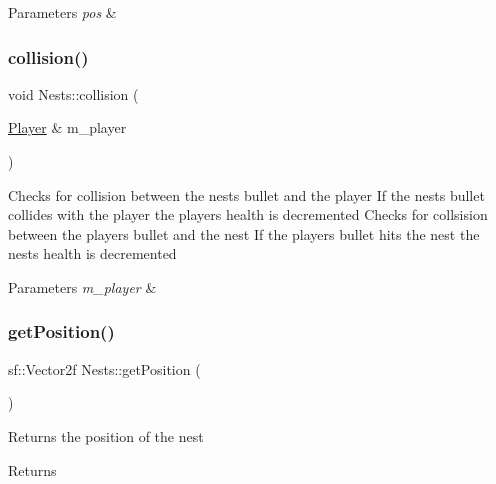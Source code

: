 \begin{DoxyParams}{Parameters}
{\em pos} & \\
\hline
\end{DoxyParams}
\mbox{\label{class_nests_a524f84ef21f6cf7943f2a82eecc1d18e}} 
\subsubsection{\texorpdfstring{collision()}{collision()}}
{\footnotesize\ttfamily void Nests\+::collision (\begin{DoxyParamCaption}\item[{\mbox{\hyperlink{class_player}{Player}} \&}]{m\+\_\+player }\end{DoxyParamCaption})}



Checks for collision between the nests bullet and the player If the nests bullet collides with the player the players health is decremented Checks for collsision between the players bullet and the nest If the player\textquotesingle{}s bullet hits the nest the nests\textquotesingle{} health is decremented 


\begin{DoxyParams}{Parameters}
{\em m\+\_\+player} & \\
\hline
\end{DoxyParams}
\mbox{\label{class_nests_a3869bcee468b9ecfdb4200fcb6857c5d}} 
\subsubsection{\texorpdfstring{getPosition()}{getPosition()}}
{\footnotesize\ttfamily sf\+::\+Vector2f Nests\+::get\+Position (\begin{DoxyParamCaption}{ }\end{DoxyParamCaption})}



Returns the position of the nest 

\begin{DoxyReturn}{Returns}

\end{DoxyReturn}
\mbox{\label{class_nests_afc6913bd1628de06319db793053adb79}} 
